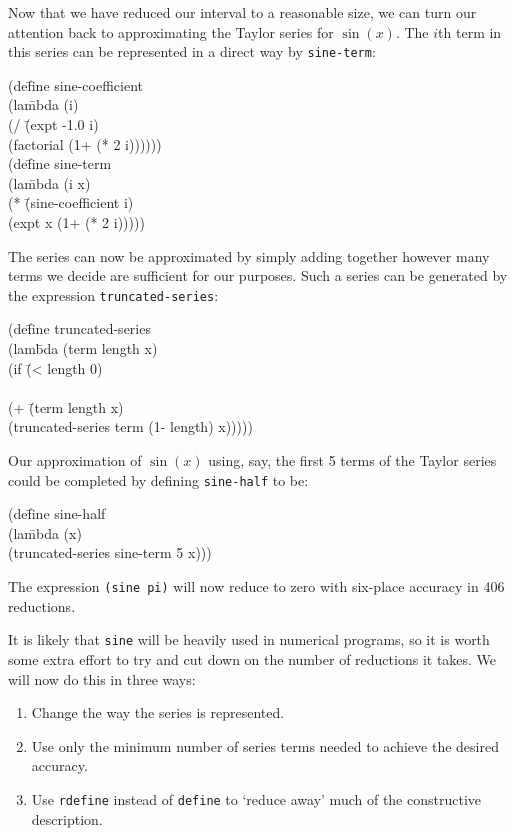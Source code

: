 	Now that we have reduced our interval to a reasonable size, we can
turn our attention back to approximating the Taylor series for $\sin(x)$.
The $i$th term in this series can be represented in a direct way 
by {\tt sine-term}:
\begin{tt}\begin{tabbing}
(de\=fine sine-coefficient\\
\>	(la\=mbda (i)\\
\>\>	(/ \=(expt -1.0 i) \\
\>\>\>			(factorial (1+ (* 2 i))))))\\[.10in]
\kill
(de\=fine sine-term \\
\>	(la\=mbda (i x)\\
\>\>		(* \=(sine-coefficient i)\\
\>\>\>		(expt x (1+ (* 2 i)))))
\end{tabbing}\end{tt}
The series can now be approximated by simply adding together 
however many terms we decide are sufficient for our purposes.
Such a series can be generated by the expression {\tt truncated-series}:
\begin{tt}\begin{tabbing}
(de\=fine truncated-series\\
\>	(lam\=bda (term length x)\\
\>\>		(if \=(< length 0)\\
\>\>\\
\>\>\>			(+ \=(term length x)\\
\>\>\>\>				(truncated-series term (1- length) x)))))
\end{tabbing}\end{tt}
Our approximation of $\sin(x)$ using, say, the first 5 terms of the
Taylor series could be completed by defining {\tt sine-half} to be:
\begin{tt}\begin{tabbing}
(de\=fine sine-half\\
\>	(la\=mbda (x)\\
\>\>		(truncated-series sine-term 5 x)))
\end{tabbing}\end{tt}
The expression {\tt (sine pi)} will now reduce to zero with six-place accuracy
in 406 reductions.  

	It is likely that
{\tt sine} will be heavily used in numerical programs, so it is worth
some extra effort to try and cut down on the number of reductions it
takes.  We will now do this in three ways:  
\begin{enumerate}
	\item Change the way the series is represented.
	\item Use only the minimum number of series terms needed to achieve 
the desired accuracy.
	\item Use {\tt rdefine} instead of {\tt define} to `reduce away' much
of the constructive description.
\end{enumerate}


